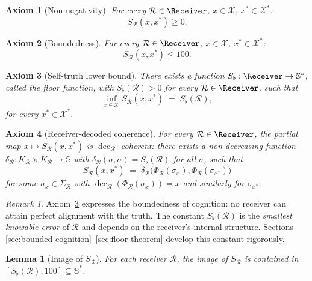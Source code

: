 \documentclass[twocolumn,11pt,a4paper]{article}
\theoremstyle{thmstyle}
\newtheorem{lemma}[theorem]{Lemma}
\theoremstyle{thmstyle}
\newtheorem{axiom}{Axiom}
\theoremstyle{definition}
\theoremstyle{remark}
\newtheorem{remark}[theorem]{Remark}
\DeclareMathOperator{\dec}{dec}
\newcommand{\Sscale}{\mathbb{S}}
\newcommand{\Cands}{\mathcal{X}}
\newcommand{\Truth}{\mathcal{X}^{*}}
\newcommand{\receiver}{\mathcal{R}}
\newcommand{\Sscalar}{S}
\newcommand{\Sfloor}{S_{\flat}}
\begin{document}
\begin{axiom}[Non-negativity]\label{ax:S1}
For every $\receiver \in \Receiver$, $x \in \Cands$,
$x^{*} \in \Truth$:
\[
\Sscalar_{\receiver}(x, x^{*}) \geq 0.
\]
\end{axiom}

\begin{axiom}[Boundedness]\label{ax:S2}
For every $\receiver \in \Receiver$, $x \in \Cands$,
$x^{*} \in \Truth$:
\[
\Sscalar_{\receiver}(x, x^{*}) \leq 100.
\]
\end{axiom}

\begin{axiom}[Self-truth lower bound]\label{ax:S3}
There exists a function $\Sfloor : \Receiver \to \Sscale^{*}$,
called the \emph{floor function}, with
$\Sfloor(\receiver) > 0$ for every $\receiver \in \Receiver$,
such that
\[
\inf_{x \in \Cands} \Sscalar_{\receiver}(x, x^{*})
   \;=\; \Sfloor(\receiver),
\]
for every $x^{*} \in \Truth$.
\end{axiom}

\begin{axiom}[Receiver-decoded coherence]\label{ax:S4}
For every $\receiver \in \Receiver$, the partial map
$x \mapsto \Sscalar_{\receiver}(x, x^{*})$ is
$\dec_{\receiver}$-coherent: there exists a
non-decreasing function
$\delta_{\receiver}: K_{\receiver} \times K_{\receiver}
   \to \Sscale$
with $\delta_{\receiver}(\sigma,\sigma) = \Sfloor(\receiver)$
for all $\sigma$, such that
\[
\Sscalar_{\receiver}(x, x^{*})
\;=\; \delta_{\receiver}\bigl(\Phi_{\receiver}(\sigma_{x}),
                              \Phi_{\receiver}(\sigma_{x^{*}})\bigr)
\]
for some $\sigma_{x} \in \Sigma_{\receiver}$
with $\dec_{\receiver}(\Phi_{\receiver}(\sigma_{x})) = x$
and similarly for $\sigma_{x^{*}}$.
\end{axiom}

\begin{remark}\label{rem:why-axiom-3}
Axiom~\ref{ax:S3} expresses the boundedness of cognition:
no receiver can attain perfect alignment with the truth.
The constant $\Sfloor(\receiver)$ is the
\emph{smallest knowable error} of $\receiver$ and depends
on the receiver's internal structure. Sections
\ref{sec:bounded-cognition}--\ref{sec:floor-theorem}
develop this constant rigorously.
\end{remark}

\begin{lemma}[Image of $\Sscalar_{\receiver}$]\label{lem:image-S}
For each receiver $\receiver$, the image of
$\Sscalar_{\receiver}$ is contained in
$[\Sfloor(\receiver), 100] \subseteq \Sscale^{*}$.
\end{lemma}
\end{document}
